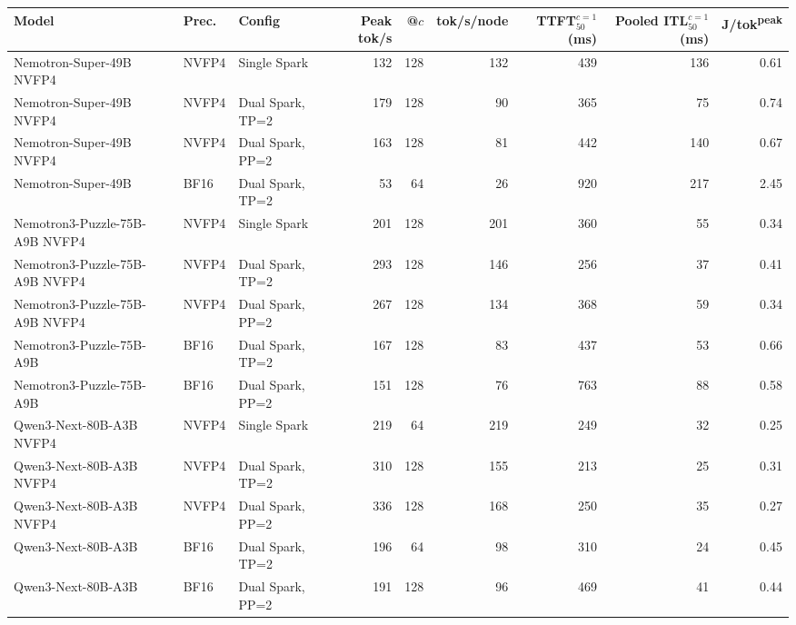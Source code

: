 \begin{tabular}{l l l r r r r r r}
\toprule
Model & Prec. & Config & Peak tok/s & @$c$ & tok/s/node & TTFT$^{c=1}_{50}$ (ms) & Pooled ITL$^{c=1}_{50}$ (ms) & J/tok\textsuperscript{peak} \\
\midrule
Nemotron-Super-49B NVFP4 & NVFP4 & Single Spark & 132 & 128 & 132 & 439 & 136 & 0.61 \\
Nemotron-Super-49B NVFP4 & NVFP4 & Dual Spark, TP=2 & 179 & 128 & 90 & 365 & 75 & 0.74 \\
Nemotron-Super-49B NVFP4 & NVFP4 & Dual Spark, PP=2 & 163 & 128 & 81 & 442 & 140 & 0.67 \\
\addlinespace
Nemotron-Super-49B & BF16 & Dual Spark, TP=2 & 53 & 64 & 26 & 920 & 217 & 2.45 \\
\addlinespace
Nemotron3-Puzzle-75B-A9B NVFP4 & NVFP4 & Single Spark & 201 & 128 & 201 & 360 & 55 & 0.34 \\
Nemotron3-Puzzle-75B-A9B NVFP4 & NVFP4 & Dual Spark, TP=2 & 293 & 128 & 146 & 256 & 37 & 0.41 \\
Nemotron3-Puzzle-75B-A9B NVFP4 & NVFP4 & Dual Spark, PP=2 & 267 & 128 & 134 & 368 & 59 & 0.34 \\
\addlinespace
Nemotron3-Puzzle-75B-A9B & BF16 & Dual Spark, TP=2 & 167 & 128 & 83 & 437 & 53 & 0.66 \\
Nemotron3-Puzzle-75B-A9B & BF16 & Dual Spark, PP=2 & 151 & 128 & 76 & 763 & 88 & 0.58 \\
\addlinespace
Qwen3-Next-80B-A3B NVFP4 & NVFP4 & Single Spark & 219 & 64 & 219 & 249 & 32 & 0.25 \\
Qwen3-Next-80B-A3B NVFP4 & NVFP4 & Dual Spark, TP=2 & 310 & 128 & 155 & 213 & 25 & 0.31 \\
Qwen3-Next-80B-A3B NVFP4 & NVFP4 & Dual Spark, PP=2 & 336 & 128 & 168 & 250 & 35 & 0.27 \\
\addlinespace
Qwen3-Next-80B-A3B & BF16 & Dual Spark, TP=2 & 196 & 64 & 98 & 310 & 24 & 0.45 \\
Qwen3-Next-80B-A3B & BF16 & Dual Spark, PP=2 & 191 & 128 & 96 & 469 & 41 & 0.44 \\
\bottomrule
\end{tabular}
